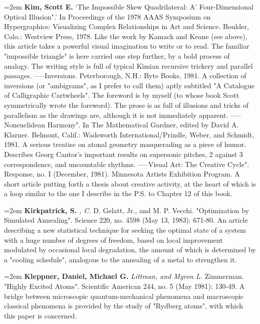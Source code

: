 \par\noindent\hangindent=2em {\bf Kim, Scott E.} `The Impossible Skew Quadrilateral: A' Four-Dimensional Optical Illusion".' In Proceedings of the 1978 AAAS Symposium on Hypergraphics: Visualizing Complex Relationships in Art and Science. Boulder, Colo.: Westview Press, 1978. Like the work by Kamack and Keane (see above), this article takes a powerful visual imagination to write or to read. The familiar "impossible triangle" is here carried one step further, by a bold process of analogy. The writing style is full of typical Kimian recursive trickery and parallel passages. -----Inversions. Peterborough, N.H.: Byte Books, 1981. A collection of inversions (or "ambigrams", as I prefer to call them) aptly subtitled "A Catalogue of Calligraphic Cartwheels". The foreword is by myself (to whose book Scott symmetrically wrote the foreword). The prose is as full of illusions and tricks of parallelism as the drawings are, although it is not immediately apparent. -----Noneuclidean Harmony". In The Mathematical Gardner, edited by David A. Klarner. Belmont, Calif.: Wadsworth International/Prindle, Weber, and Schmidt, 1981. A serious treatise on atonal geometry masquerading as a piece of humor. Describes Georg Cantor's important results on supersonic pitches, 2 against 3 correspondence, and uncountable rhythms. -----Visual Art: The Creative Cycle". Response, no. I (December, 1981). Minnesota Artists Exhibition Program. A short article putting forth a thesis about creative activity, at the heart of which is a loop similar to the one I describe in the P.S. to Chapter 12 of this book.

\par\noindent\hangindent=2em {\bf Kirkpatrick, S.} {\it , C.} D. Gelatt, Jr., and M. P. Vecchi. "Optimization by Simulated Annealing". Science 220, no. 4598 (May 13, 1983): 671-80. An article describing a new statistical technique for seeking the optimal state of a system with a huge number of degrees of freedom, based on local improvement modulated by occasional local degradation, the amount of which is determined by a "cooling schedule", analogous to the annealing of a metal to strengthen it.

\par\noindent\hangindent=2em {\bf Kleppner, Daniel, Michael G.} {\it Littman, and Myron L.} Zimmerman. "Highly Excited Atoms". Scientific American 244, no. 5 (May 1981): 130-49. A bridge between microscopic quantum-mechanical phenomena and macroscopic classical phenomena is provided by the study of "Rydberg atoms", with which this paper is concerned.


